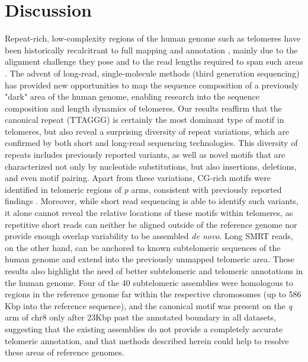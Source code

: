 \documentclass{article}
\begin{document}
\section*{Discussion}  \label{sec:discussion}
Repeat-rich, low-complexity regions of the human genome such as telomeres have been historically recalcitrant to full mapping and annotation \cite{miga2015}, mainly due to the alignment challenge they pose and to the read lengths required to span such areas \cite{ngslowcomplexity}.
The advent of long-read, single-molecule methods (third generation sequencing) has provided new opportunities to map the sequence composition of a previously "dark" area of the human genome, enabling research into the sequence composition and length dynamics \cite{luxton2020} of telomeres. %
Our results reaffirm that the canonical repeat (TTAGGG) is certainly the most dominant type of motif in telomeres, but also reveal a surprising diversity of repeat variations, which are confirmed by both short and long-read sequencing technologies.
This diversity of repeats includes previously reported variants, as well as novel motifs that are characterized not only by nucleotide substitutions, but also insertions, deletions, and even motif pairing.
Apart from these variations, CG-rich motifs were identified in telomeric regions of \textit{p} arms, consistent with previously reported findings \cite{cpg}.
Moreover, while short read sequencing is able to identify such variants, it alone cannot reveal the relative locations of these motifs within telomeres, as repetitive short reads can neither be aligned outside of the reference genome nor provide enough overlap variability to be assembled \textit{de novo}. %
Long SMRT reads, on the other hand, can be anchored to known subtelomeric sequences of the human genome and extend into the previously unmapped telomeric area.
These results also highlight the need of better subtelomeric and telomeric annotations in the human genome.
Four of the 40 subtelomeric assemblies \cite{riethman2014} were homologous to regions in the reference genome far within the respective chromosomes (up to 586 Kbp into the reference sequence), and the canonical motif was present on the \textit{q} arm of chr8 only after 2\textendash{}3Kbp past the annotated boundary in all datasets, suggesting that the existing assemblies do not provide a completely accurate telomeric annotation, and that methods described herein could help to resolve these areas of reference genomes.
\end{document}
